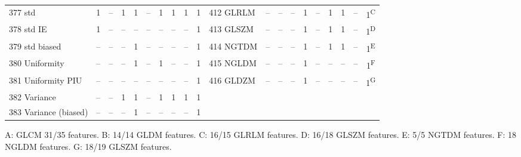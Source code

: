 \documentclass[sn-mathphys,Numbered]{sn-jnl}%
\theoremstyle{thmstyleone}%
\theoremstyle{thmstyletwo}%
\theoremstyle{thmstylethree}%
\begin{document}
\begin{table} [!hbt]
\begin{tiny}
\begin{tabular} {
  l  c  c  c  c  c  c  c  c  c   l  c  c  c  c  c  c  c  c  c
}
 377 std & 1 & -- & 1 & 1 & -- & 1 & 1 & 1 & 1 & 412 GLRLM & -- & -- & -- & 1 & -- & 1 & 1 & -- & 1\textsuperscript{C} \\
 378 std IE & 1 & -- & -- & -- & -- & -- & -- & -- & 1 & 413 GLSZM & -- & -- & -- & 1 & -- & 1 & 1 & -- & 1\textsuperscript{D} \\
 379 std biased & -- & -- & -- & 1 & -- & -- & -- & -- & 1 & 414 NGTDM & -- & -- & -- & 1 & -- & 1 & 1 & -- & 1\textsuperscript{E} \\
 380 Uniformity & -- & -- & -- & 1 & -- & 1 & -- & -- & 1 & 415 NGLDM & -- & -- & -- & 1 & -- & -- & -- & -- & 1\textsuperscript{F} \\
 381 Uniformity PIU & -- & -- & -- & -- & -- & -- & -- & -- & 1 & 416 GLDZM & -- & -- & -- & 1 & -- & -- & -- & -- & 1\textsuperscript{G} \\
 382 Variance & -- & -- & 1 & 1 & -- & 1 & 1 & 1 & 1 &   &  &  &  &  &  &  &  &  &  \\
 383 Variance (biased) & -- & -- & -- & 1 & -- & -- & -- & -- & 1 &   &  &  &  &  &  &  &  &  &  \\

\bottomrule
\end{tabular}
\end{tiny}
\vspace{1ex}
\begin{tiny}
{\raggedright
A: GLCM 31/35 features.
B: 14/14 GLDM features.
C: 16/15 GLRLM features.
D: 16/18 GLSZM features.
E: 5/5 NGTDM features.
F: 18 NGLDM features.
G: 18/19 GLSZM features.
\par}
\end{tiny}
\end{table}

\end{document}
